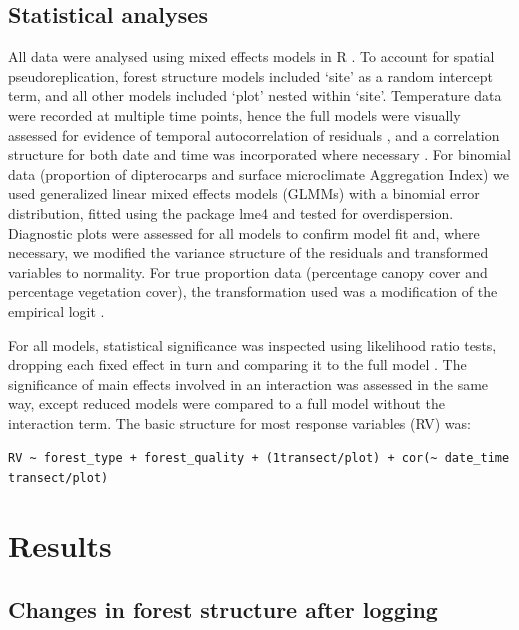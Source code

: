 \documentclass[12pt,a4paper,]{report}
\theoremstyle{definition}
\theoremstyle{definition}
\theoremstyle{definition}
\theoremstyle{remark}
\begin{document}
\subsection{Statistical analyses}\label{statistical-analyses}

All data were analysed using mixed effects models in R \citep[version
3.3.0;][]{r_core_team_2017}. To account for spatial pseudoreplication,
forest structure models included `site' as a random intercept term, and
all other models included `plot' nested within `site'. Temperature data
were recorded at multiple time points, hence the full models were
visually assessed for evidence of temporal autocorrelation of residuals
\citep[function `acf' in the nlme package;][]{pinheiro_nlme:_2017}, and
a correlation structure for both date and time was incorporated where
necessary \citep[the specific structure was chosen using
AIC;][]{zuur_mixed_2009}. For binomial data (proportion of dipterocarps
and surface microclimate Aggregation Index) we used generalized linear
mixed effects models (GLMMs) with a binomial error distribution, fitted
using the package lme4 \citep{bates_fitting_2015} and tested for
overdispersion. Diagnostic plots were assessed for all models to confirm
model fit and, where necessary, we modified the variance structure of
the residuals \citep{zuur_mixed_2009} and transformed variables to
normality. For true proportion data (percentage canopy cover and
percentage vegetation cover), the transformation used was a modification
of the empirical logit \citep{warton_arcsine_2011}.

For all models, statistical significance was inspected using likelihood
ratio tests, dropping each fixed effect in turn and comparing it to the
full model \citep{zuur_mixed_2009}. The significance of main effects
involved in an interaction was assessed in the same way, except reduced
models were compared to a full model without the interaction term. The
basic structure for most response variables (RV) was:

\texttt{RV\ \textasciitilde{}\ forest\_type\ +\ forest\_quality\ +\ (1\textbar{}transect/plot)\ +\ cor(\textasciitilde{}\ date\_time\textbar{}transect/plot)}

\section{Results}\label{results-2}

\subsection{Changes in forest structure after
logging}\label{changes-in-forest-structure-after-logging}
\end{document}
